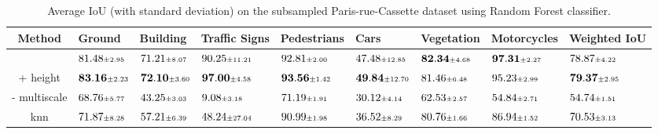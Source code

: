\documentclass{article}
\begin{document}
\begin{table}
    \hspace*{-3cm}
    \begin{tabular}{cllllllll}
        Method & Ground & Building & Traffic Signs & Pedestrians & Cars & Vegetation & Motorcycles & Weighted IoU \\
        \hline
        \cite{thomas_semantic_2018} & $81.48 \mtiny{\pm 2.95}$ & $71.21 \mtiny{\pm 8.07}$ & $90.25 \mtiny{\pm 11.21}$ & $92.81 \mtiny{\pm 2.00}$ & $47.48 \mtiny{\pm 12.85}$ & $\mathbf{82.34} \mtiny{\pm 4.68}$ & $\mathbf{97.31} \mtiny{\pm 2.27}$ & $78.87 \mtiny{\pm 4.22}$ \\
        + height & $\mathbf{83.16} \mtiny{\pm 2.23}$ & $\mathbf{72.10} \mtiny{\pm 3.60}$ & $\mathbf{97.00} \mtiny{\pm 4.58}$ & $\mathbf{93.56} \mtiny{\pm 1.42}$ & $\mathbf{49.84} \mtiny{\pm 12.70}$ & $81.46 \mtiny{\pm 6.48}$ & $95.23 \mtiny{\pm 2.99}$ & $\mathbf{79.37} \mtiny{\pm 2.95}$ \\
        - multiscale & $68.76 \mtiny{\pm 5.77}$ & $43.25 \mtiny{\pm 3.03}$ & $9.08 \mtiny{\pm 3.18}$ & $71.19 \mtiny{\pm 1.91}$ & $30.12 \mtiny{\pm 4.14}$ & $62.53 \mtiny{\pm 2.57}$ & $54.84 \mtiny{\pm 2.71}$ & $54.74 \mtiny{\pm 1.51}$ \\
        knn & $71.87 \mtiny{\pm 8.28}$ & $57.21 \mtiny{\pm 6.39}$ & $48.24 \mtiny{\pm 27.04}$ & $90.99 \mtiny{\pm 1.98}$ & $36.52 \mtiny{\pm 8.29}$ & $80.76 \mtiny{\pm 1.66}$ & $86.94 \mtiny{\pm 1.52}$ & $70.53 \mtiny{\pm 3.13}$ \\
\end{tabular}
\caption{ Average IoU (with standard deviation) on the subsampled Paris-rue-Cassette dataset using Random Forest classifier.}
    \label{tab:benchmark_RF}
\end{table}
\end{document}
